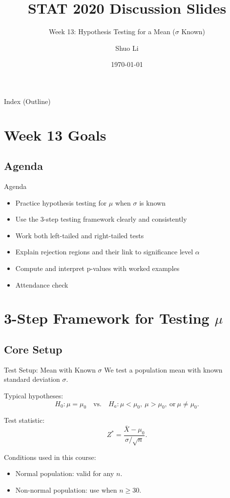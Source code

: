 \documentclass[aspectratio=169]{beamer}
\title[STAT 2020 Week 13 \hfill \insertframenumber/\inserttotalframenumber]{STAT 2020 Discussion Slides}
\subtitle{Week 13: Hypothesis Testing for a Mean (\(\sigma\) Known)}
\author{Shuo Li}
\institute{University of Iowa}
\date{\today}
\begin{document}
\begin{frame}
  \titlepage
\end{frame}

\begin{frame}{Index (Outline)}
  \tableofcontents[hideallsubsections]
\end{frame}

\section{Week 13 Goals}

\subsection{Agenda}
\begin{frame}{Agenda}
  \begin{itemize}
    \item Practice hypothesis testing for \(\mu\) when \(\sigma\) is known
    \item Use the 3-step testing framework clearly and consistently
    \item Work both left-tailed and right-tailed tests
    \item Explain rejection regions and their link to significance level \(\alpha\)
    \item Compute and interpret p-values with worked examples
    \item Attendance check
  \end{itemize}
\end{frame}

\section{3-Step Framework for Testing \(\mu\)}

\subsection{Core Setup}
\begin{frame}{Test Setup: Mean with Known \(\sigma\)}
  We test a population mean with known standard deviation \(\sigma\).

  \vspace{2mm}
  Typical hypotheses:
  \[
    H_0:\mu=\mu_0
    \quad\text{vs.}\quad
    H_a:\mu<\mu_0,\ \mu>\mu_0,\ \text{or}\ \mu\ne\mu_0.
  \]

  Test statistic:
  \[
    Z^*=\frac{\bar X-\mu_0}{\sigma/\sqrt{n}}.
  \]

  \vspace{1mm}
  Conditions used in this course:
  \begin{itemize}
    \item Normal population: valid for any \(n\).
    \item Non-normal population: use when \(n\ge 30\).
  \end{itemize}
\end{frame}
\end{document}
